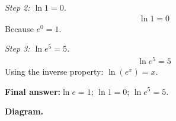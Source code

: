 \documentclass[11pt]{article}
\begin{document}
\textit{Step 2: \( \ln 1 = 0 \).}
\[\begin{gathered}
\ln 1 = 0
\end{gathered}\]
Because \( e^0 = 1 \).

\textit{Step 3: \( \ln e^5 = 5 \).}
\[\begin{gathered}
\ln e^5 = 5
\end{gathered}\]
Using the inverse property: \( \ln(e^x) = x \).

\begin{answerbox}
\textbf{Final answer:}\quad \(\displaystyle  \ln e = 1 \); \(\displaystyle  \ln 1 = 0 \); \(\displaystyle  \ln e^5 = 5 \).
\end{answerbox}
\textbf{Diagram.}

\begin{center}
\end{center}
\end{document}
